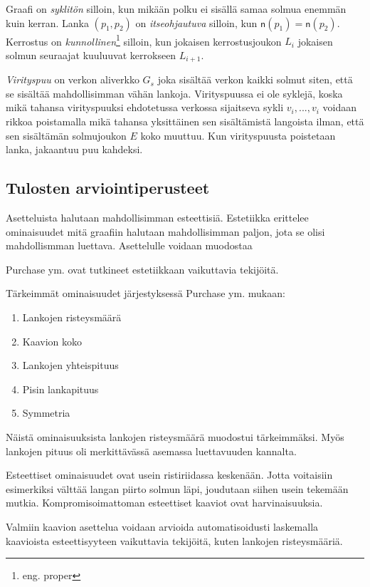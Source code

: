 \documentclass[finnish,12pt]{article}
\begin{document}
Graafi on \emph{syklitön} silloin, kun mikään polku ei sisällä samaa solmua enemmän kuin kerran.
Lanka $(p_1, p_2)$ on \emph{itseohjautuva} silloin, kun $\mathsf{n}(p_1) = \mathsf{n}(p_2)$.
Kerrostus on \emph{kunnollinen}\footnote{eng. proper} silloin, kun jokaisen kerrostusjoukon $L_i$ jokaisen solmun seuraajat kuuluuvat kerrokseen $L_{i+1}$.

\emph{Virityspuu} on verkon aliverkko $G_s$ joka sisältää verkon kaikki solmut siten, että se sisältää mahdollisimman vähän lankoja.
Virityspuussa ei ole syklejä, koska mikä tahansa virityspuuksi ehdotetussa verkossa sijaitseva sykli $v_i, ... , v_i$ voidaan rikkoa poistamalla mikä tahansa yksittäinen sen sisältämistä langoista ilman, että sen sisältämän solmujoukon $E$ koko muuttuu.
Kun virityspuusta poistetaan lanka, jakaantuu puu kahdeksi.

 		\subsection{Tulosten arviointiperusteet}

Asetteluista halutaan mahdollisimman esteettisiä.
Estetiikka erittelee ominaisuudet mitä graafiin halutaan mahdollisimman paljon, jota se olisi mahdollismman luettava.
Asettelulle voidaan muodostaa 

Purchase ym. ovat tutkineet estetiikkaan vaikuttavia tekijöitä. \cite{RefWorks:47}

Tärkeimmät ominaisuudet järjestyksessä Purchase ym. mukaan: 
\begin{enumerate}
  \item Lankojen risteysmäärä
  \item Kaavion koko
  \item Lankojen yhteispituus
  \item Pisin lankapituus
  \item Symmetria
\end{enumerate}

Näistä ominaisuuksista lankojen risteysmäärä muodostui tärkeimmäksi. Myös lankojen pituus oli merkittävässä asemassa luettavuuden kannalta.

Esteettiset ominaisuudet ovat usein ristiriidassa keskenään.
Jotta voitaisiin esimerkiksi välttää langan piirto solmun läpi, joudutaan siihen usein tekemään mutkia.
Kompromisoimattoman esteettiset kaaviot ovat harvinaisuuksia.

Valmiin kaavion asettelua voidaan arvioida automatisoidusti laskemalla kaavioista esteettisyyteen vaikuttavia tekijöitä, kuten lankojen risteysmääriä.
\end{document}
